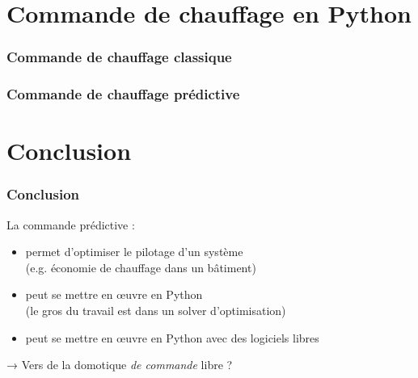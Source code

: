 \section{Commande de chauffage en Python}

\begin{frame}
  \frametitle{Commande de chauffage classique}

\end{frame}

\begin{frame}
  \frametitle{Commande de chauffage prédictive}

\end{frame}


\section{Conclusion}



\begin{frame}[c]
  \frametitle{Conclusion}
  
  \begin{block}{La commande prédictive :}
  \begin{itemize}
   \item permet d'optimiser le pilotage d'un système\\ (e.g. économie de chauffage dans un bâtiment)
   \item peut se mettre en œuvre en Python \\(le gros du travail est dans un solver d'optimisation)
   \item peut se mettre en œuvre en Python avec des logiciels libres
  \end{itemize}
  \end{block}
  
  \pause
  \begin{block}{}
   → Vers de la domotique \emph{de commande} libre ?
  \end{block}


  
\end{frame}

